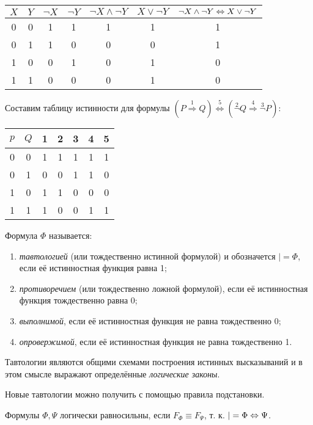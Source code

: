 \begin{tabular}{|ccccccc|}
    \hline
    $X$ & $Y$ & $\lnot X$ & $\lnot Y$ & $\lnot X \land \lnot Y$ & $X \lor \lnot Y$ & $\lnot X \land \lnot Y \Leftrightarrow X \lor \lnot Y$ \\
    \hline
    0 & 0 & 1 & 1 & 1 & 1 & 1 \\
    0 & 1 & 1 & 0 & 0 & 0 & 1 \\
    1 & 0 & 0 & 1 & 0 & 1 & 0 \\
    1 & 1 & 0 & 0 & 0 & 1 & 0 \\
    \hline
\end{tabular}

\ex Составим таблицу истинности для формулы $(P \overset 1 \Rightarrow Q) \overset 5 \Leftrightarrow (\overset 2 \lnot Q \overset 4 \Rightarrow \overset 3 \lnot P)$:

\begin{tabular}{|ccccccc|}
    \hline
    $p$ & $Q$ & 1 & 2 & 3 & 4 & 5 \\
    \hline
    0 & 0 & 1 & 1 & 1 & 1 & 1 \\
    0 & 1 & 0 & 0 & 1 & 1 & 0 \\
    1 & 0 & 1 & 1 & 0 & 0 & 0 \\
    1 & 1 & 1 & 0 & 0 & 1 & 1 \\
    \hline
\end{tabular}

\dftion Формула $\Phi$ называется:
\begin{enumerate}
    \item \textit{тавтологией} (или тождественно истинной формулой) и обозначется $|= \Phi$, если её истинностная функция равна 1;
    \item \textit{противоречием} (или тождественно ложной формулой), если её истинностная функция тождественно равна 0;
    \item \textit{выполнимой}, если её истинностная функция не равна тождественно 0;
    \item \textit{опровержимой}, если её истинностная функция не равна тождественно 1.
\end{enumerate}

\dftion Тавтологии являются общими схемами построения истинных высказываний и в этом смысле выражают определённые \textit{логические законы}.

Новые тавтологии можно получить с помощью правила подстановки.

Формулы $\Phi, \Psi$ логически равносильны, если $F_\Phi \equiv F_\Psi$, т. к. $|= \Phi \Leftrightarrow \Psi$.

